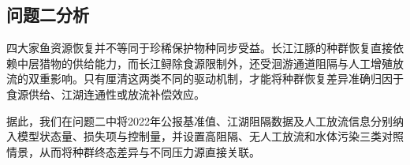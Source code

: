 \subsection{问题二分析}
四大家鱼资源恢复并不等同于珍稀保护物种同步受益。长江江豚的种群恢复直接依赖中层猎物的供给能力，而长江鲟除食源限制外，还受洄游通道阻隔与人工增殖放流的双重影响。只有厘清这两类不同的驱动机制，才能将种群恢复差异准确归因于食源供给、江湖连通性或放流补偿效应。

据此，我们在问题二中将2022年公报基准值、江湖阻隔数据及人工放流信息分别纳入模型状态量、损失项与控制量，并设置高阻隔、无人工放流和水体污染三类对照情景，从而将种群终态差异与不同压力源直接关联。

